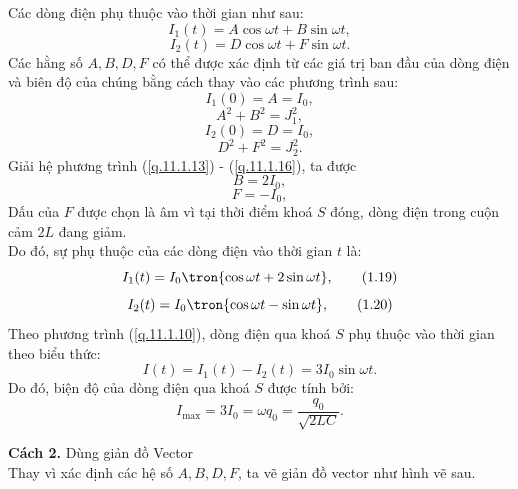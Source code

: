 \begin{loigiai}
{
}
    Các dòng điện phụ thuộc vào thời gian như sau:
    \[ I_1(t) = A\cos \omega t + B \sin \omega t, \tag{1.11} \label{q.11.1.11}\]
    \[I_2(t) = D \cos \omega t + F \sin \omega t. \tag{1.12} \label{q.11.1.12}\]
    Các hằng số $A, B, D, F$ có thể được xác định từ các giá trị ban đầu của dòng điện và biên độ của chúng bằng cách thay vào các phương trình sau:
    \[ I_1(0) = A = I_0,\tag{1.13} \label{q.11.1.13}\]
    \[A^2 + B^2 = J_1^2,\tag{1.14} \label{q.11.1.14}\]
    \[I_2(0) = D = I_0,\tag{1.15} \label{q.11.1.15}\]
    \[D^2 + F^2 = J_2^2.\tag{1.16} \label{q.11.1.16}\]
    Giải hệ phương trình (\ref{q.11.1.13}) - (\ref{q.11.1.16}), ta được
    \[B = 2I_0,\tag{1.17} \label{q.11.1.17}\]
    \[F = -I_0,\tag{1.18} \label{q.11.1.18}\]
    Dấu của $F$ được chọn là âm vì tại thời điểm khoá $S$ đóng, dòng điện trong cuộn cảm $2L$ đang giảm.\\
    Do đó, sự phụ thuộc của các dòng điện vào thời gian $t$ là:
    \[I_1(t) = I_0 \tron{\cos \omega t + 2\sin \omega t}, \tag{1.19} \label{q.11.1.19}\]
    \[I_2(t) = I_0 \tron{\cos \omega t - \sin \omega t},\tag{1.20} \label{q.11.1.20}\]
    Theo phương trình (\ref{q.11.1.10}), dòng điện qua khoá $S$ phụ thuộc vào thời gian theo biểu thức:
    \[I(t) = I_1(t) - I_2(t) = 3I_0 \sin \omega t. \tag{1.21} \label{q.11.1.21} \]
    Do đó, biện độ của dòng điện qua khoá $S$ được tính bởi:
    \[I_{\max} = 3I_0 = \omega q_0 = \dfrac{q_0}{\sqrt{2LC}}. \tag{1.22} \label{q.11.1.22}\]
    
    \textbf{Cách 2.} Dùng giản đồ Vector\\
    Thay vì xác định các hệ số $A, B, D, F$, ta vẽ giản đồ vector như hình vẽ sau.
    \begin{center}

\begin{tikzpicture}[x=0.75pt,y=0.75pt,yscale=-1,xscale=1]


\end{tikzpicture}
\end{center}
\end{loigiai}
